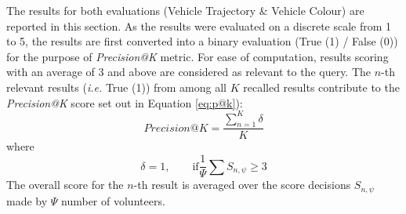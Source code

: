 The results for both evaluations (Vehicle Trajectory \& Vehicle Colour) are reported in this section. As the results were evaluated on a discrete scale from 1 to 5, the results are first converted into a binary evaluation (True (1) /
False (0)) for the purpose of \textit{Precision@K} metric. For ease of computation, results scoring with an average of 3 and above are considered as relevant to the query. The $n$-th relevant results (\emph{i.e.} True (1)) from among all $K$ recalled results contribute to the
\textit{Precision@K} score set out in Equation \ref{eq:p@k}):
\begin{equation}
\label{eq:p@k}
Precision@K =  \frac{\sum_{n=1}^K \delta}{K}
\end{equation}
where 
\begin{equation}
\delta=1, \qquad \text{if} \frac{1}{\Psi}\sum S_{n,\psi} \geq 3
\end{equation}
The overall score for the $n$-th result is averaged over the score decisions $S_{n,\psi}$ made by $\Psi$ number of volunteers.

